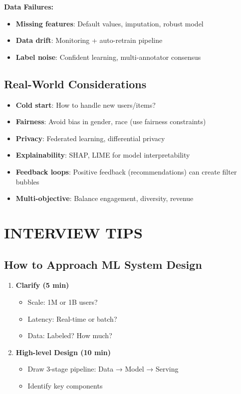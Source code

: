 \documentclass[8pt,landscape]{article}
\begin{document}
\begin{multicols}{3}
\textbf{Data Failures:}
\begin{itemize}
\item \textbf{Missing features}: Default values, imputation, robust model
\item \textbf{Data drift}: Monitoring + auto-retrain pipeline
\item \textbf{Label noise}: Confident learning, multi-annotator consensus
\end{itemize}

\subsection*{Real-World Considerations}

\begin{itemize}
\item \textbf{Cold start}: How to handle new users/items?
\item \textbf{Fairness}: Avoid bias in gender, race (use fairness constraints)
\item \textbf{Privacy}: Federated learning, differential privacy
\item \textbf{Explainability}: SHAP, LIME for model interpretability
\item \textbf{Feedback loops}: Positive feedback (recommendations) can create filter bubbles
\item \textbf{Multi-objective}: Balance engagement, diversity, revenue
\end{itemize}

\section*{INTERVIEW TIPS}

\subsection*{How to Approach ML System Design}

\begin{enumerate}
\item \textbf{Clarify (5 min)}
\begin{itemize}
\item Scale: 1M or 1B users?
\item Latency: Real-time or batch?
\item Data: Labeled? How much?
\end{itemize}

\item \textbf{High-level Design (10 min)}
\begin{itemize}
\item Draw 3-stage pipeline: Data → Model → Serving
\item Identify key components
\end{itemize}


\end{enumerate}
\end{multicols}
\end{document}
